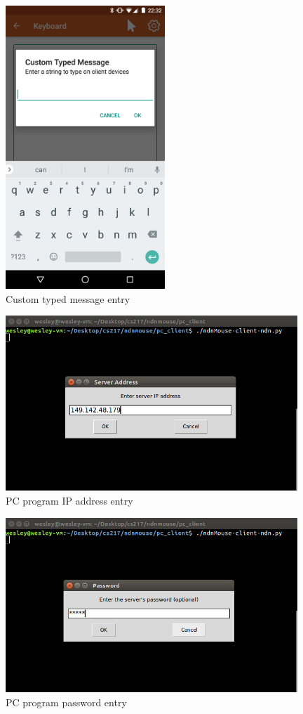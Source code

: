 \documentclass{sig-alternate}
\renewcommand\_{\textunderscore\allowbreak}  %
\begin{document}
\begin{figure}[ht]
	\hypertarget{fig:custom\_type\_message}{}
	\centering
	\caption{Custom typed message entry}
	\includegraphics[width=6cm]{screenshots/custom_type_message}
\end{figure}

\begin{figure}[ht]
	\hypertarget{fig:client1}{}
	\centering
	\caption{PC program IP address entry}
	\includegraphics[width=11cm]{screenshots/client1}
\end{figure}

\begin{figure}[ht]
	\hypertarget{fig:client2}{}
	\centering
	\caption{PC program password entry}
	\includegraphics[width=11cm]{screenshots/client2}
\end{figure}
\end{document}
